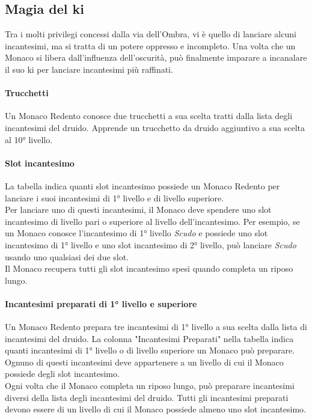 \subsection{Magia del ki}

Tra i molti privilegi concessi dalla via dell'Ombra, vi è quello di lanciare alcuni incantesimi, ma si tratta di un potere oppresso e incompleto. Una volta che un Monaco si libera dall'influenza dell'oscurità, può finalmente imparare a incanalare il suo ki per lanciare incantesimi più raffinati.

\paragraph{Trucchetti} Un Monaco Redento conosce due trucchetti a sua scelta tratti dalla lista degli incantesimi del druido. Apprende un trucchetto da druido aggiuntivo a sua scelta al 10° livello.

\paragraph{Slot incantesimo}La tabella indica quanti slot incantesimo possiede un Monaco Redento per lanciare i suoi incantesimi di 1° livello e di livello superiore. \\ Per lanciare uno di questi incantesimi, il Monaco deve spendere uno slot incantesimo di livello pari o superiore al livello dell'incantesimo. Per esempio, se un Monaco conosce l'incantesimo di 1° livello \textit{Scudo} e possiede uno slot incantesimo di 1° livello e uno slot incantesimo di 2° livello, può lanciare \textit{Scudo} usando uno qualsiasi dei due slot. \\ Il Monaco recupera tutti gli slot incantesimo spesi quando completa un riposo lungo.

\paragraph{Incantesimi preparati di 1° livello e superiore}Un Monaco Redento prepara tre incantesimi di 1° livello a sua scelta dalla lista di incantesimi del druido. La colonna "Incantesimi Preparati" nella tabella indica quanti incantesimi di 1° livello o di livello superiore un Monaco può preparare. Ognuno di questi incantesimi deve appartenere a un livello di cui il Monaco possiede degli slot incantesimo.\\ Ogni volta che il Monaco completa un riposo lungo, può preparare incantesimi diversi della lista degli incantesimi del druido. Tutti gli incantesimi preparati devono essere di un livello di cui il Monaco possiede almeno uno slot incantesimo.

